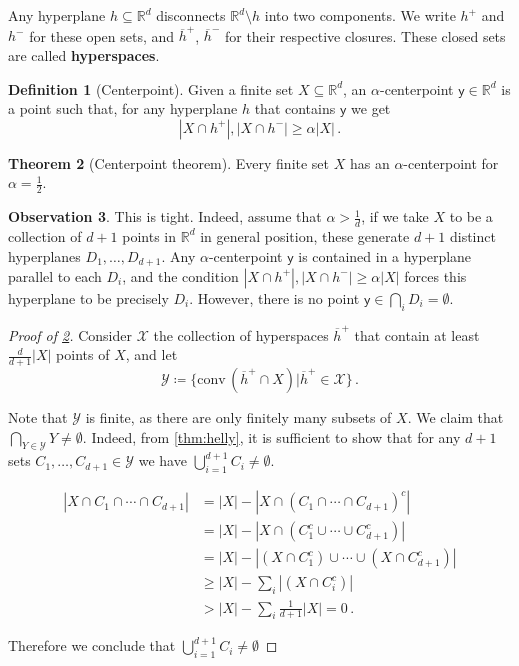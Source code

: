 \documentclass[12pt]{amsart}
\theoremstyle{definition}
\newtheorem{thm}{Theorem}[section]
\newtheorem{obs}[thm]{Observation}
\newtheorem{defin}[thm]{Definition}
\newcommand{\R}{\mathbb{R}}
\newcommand{\vy}{\mathsf{y}}
\newcommand{\conv}{\mathrm{conv}}
\begin{document}
Any hyperplane $h \subseteq \R^d$ disconnects $\R^d \setminus h$ into two components.
We write $h^+$ and $h^-$ for these open sets, and $\overline{h}^+$, $\overline{h}^-$ for their respective closures.
These closed sets are called \textbf{hyperspaces}.

\begin{defin}[Centerpoint]
Given a finite set $X \subseteq \R^d$, an $\alpha$-centerpoint $\vy \in \R^d$ is a point such that, for any hyperplane $h$ that contains $\vy$ we get
$$ |X \cap h^+|, |X\cap h^-| \geq \alpha |X| \, . $$
\end{defin}

\begin{thm}[Centerpoint theorem]\label{thm:centerpoint}
Every finite set $X$ has an $\alpha$-centerpoint for $\alpha = \frac{1}{2}$.
\end{thm}

\begin{obs}
This is tight.
Indeed, assume that $\alpha > \frac{1}{d}$, if we take $X$ to be a collection of $d+1$ points in $\R^d$ in general position, these generate $d+1$ distinct hyperplanes $D_1, \ldots, D_{d+1}$.
Any $\alpha$-centerpoint $\vy$ is contained in a hyperplane parallel to each $D_i$, and the condition $|X \cap h^+|, |X\cap h^-| \geq \alpha |X|$ forces this hyperplane to be precisely $D_i$.
However, there is no point $\vy \in \bigcap_i D_i = \emptyset$.
\end{obs}

\begin{proof}[Proof of \cref{thm:centerpoint}]
Consider $\mathcal X $ the collection of hyperspaces $\overline{h}^+$ that contain at least $\frac{d}{d+1}|X|$ points of $X$, and let 
$$ \mathcal Y \coloneqq \{ \conv \, (\overline{h}^+ \cap X) | \overline{h}^+ \in \mathcal X \}\, . $$

Note that $\mathcal Y $ is finite, as there are only finitely many subsets of $X$.
We claim that $\bigcap_{Y \in \mathcal Y} Y \neq \emptyset$.
Indeed, from \cref{thm:helly}, it is sufficient to show that for any $d+1$ sets $C_1, \ldots, C_{d+1} \in \mathcal Y$ we have $\bigcup_{i=1}^{d+1} C_i \neq \emptyset$.

\begin{align*}
|X \cap C_1\cap \cdots \cap C_{d+1} |  &= |X| - |X \cap (C_1 \cap \cdots \cap C_{d+1})^c | \\
&= |X| - |X \cap (C_1^c \cup \cdots \cup C_{d+1}^c) | \\
&= |X| - |(X \cap C_1^c) \cup \cdots \cup (X \cap C_{d+1}^c)|\\
&\geq |X| - \sum_i |(X \cap C_i^c)|\\
&> |X| - \sum_i \frac{1}{d+1} |X| = 0 \, .
\end{align*}

Therefore we conclude that $\bigcup_{i=1}^{d+1} C_i \neq \emptyset$
\end{proof}
\end{document}
